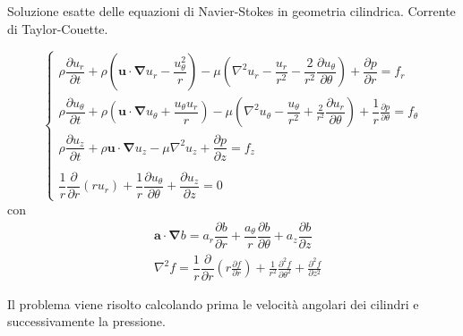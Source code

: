 \sol

\partone Soluzione esatte delle equazioni di Navier-Stokes in geometria cilindrica. Corrente di Taylor-Couette.

\begin{equation}
  \begin{cases}
    \rho \dfrac{\partial u_r}{\partial t}
    + \rho \left( \bm{u} \cdot \bm{\nabla}u_r - \dfrac{u_\theta^2}{r} \right)
    - \mu \left(\nabla^2 u_r 
       - \dfrac{u_r}{r^2} 
       - \dfrac{2}{r^2}\dfrac{\partial u_\theta}{\partial \theta} \right)  
       + \dfrac{\partial p}{\partial r} = f_r \\
    \rho \dfrac{\partial u_\theta}{\partial t}
    + \rho \left( \bm{u} \cdot \bm{\nabla} u_\theta + \dfrac{u_\theta u_r}{r} \right)
    - \mu \left(\nabla^2 u_\theta 
       - \dfrac{u_\theta}{r^2} 
       + \frac{2}{r^2}\dfrac{\partial u_r}{\partial \theta}  \right) 
    + \dfrac{1}{r} \frac{\partial p}{\partial \theta} = f_\theta\\
    \rho \dfrac{\partial u_z}{\partial t}
    + \rho \bm{u} \cdot \bm{\nabla} u_z
    - \mu \nabla^2 u_z
    + \dfrac{\partial p}{\partial z} = f_z \\ \\
    \dfrac{1}{r}\dfrac{\partial}{\partial r}\left( r u_r \right) 
    + \dfrac{1}{r}\dfrac{\partial u_\theta}{\partial \theta} 
    + \dfrac{\partial u_z}{\partial z} = 0
  \end{cases}
  \end{equation}
  con 
  \begin{equation}
  \begin{aligned}
  & \bm{a} \cdot \bm{\nabla} b = a_r \dfrac{\partial b}{\partial r} 
     + \dfrac{a_\theta}{r} \dfrac{\partial b}{\partial \theta}  
     + a_z \dfrac{\partial b}{\partial z} \\
  & \nabla^2 f = \dfrac{1}{r}\dfrac{\partial}{\partial r}
                      \left(r \frac{\partial f}{\partial r} \right) +
               \frac{1}{r^2} \frac{\partial^2 f}{\partial \theta^2} + 
               \frac{\partial^2 f}{\partial z^2} 
  \end{aligned}
  \end{equation}

\parttwo Il problema viene risolto calcolando prima le velocità angolari dei cilindri e
successivamente la pressione.

